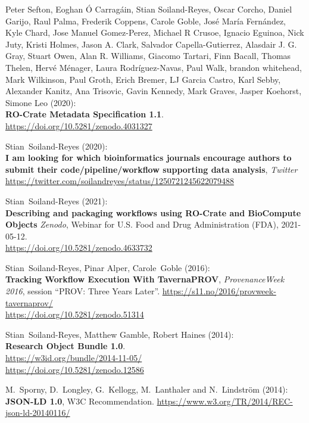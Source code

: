 \begin{thebibliography}{9}
Peter Sefton, Eoghan Ó Carragáin, Stian Soiland-Reyes, Oscar
Corcho, Daniel Garijo, Raul Palma, Frederik Coppens, Carole Goble, José
María Fernández, Kyle Chard, Jose Manuel Gomez-Perez, Michael R Crusoe,
Ignacio Eguinoa, Nick Juty, Kristi Holmes, Jason A. Clark, Salvador
Capella-Gutierrez, Alasdair J. G. Gray, Stuart Owen, Alan R. Williams,
Giacomo Tartari, Finn Bacall, Thomas Thelen, Hervé Ménager, Laura
Rodríguez-Navas, Paul Walk, brandon whitehead, Mark Wilkinson, Paul
Groth, Erich Bremer, LJ Garcia Castro, Karl Sebby, Alexander Kanitz, Ana
Trisovic, Gavin Kennedy, Mark Graves, Jasper Koehorst, Simone Leo
(2020):\\
\textbf{RO-Crate Metadata Specification 1.1}.\\
\url{https://doi.org/10.5281/zenodo.4031327}

Stian~Soiland-Reyes (2020):\\
\textbf{I am looking for which bioinformatics journals encourage authors
to submit their code/pipeline/workflow supporting data analysis},
\emph{Twitter}
\url{https://twitter.com/soilandreyes/status/1250721245622079488}

Stian~Soiland-Reyes (2021):\\
\textbf{Describing and packaging workflows using RO-Crate and BioCompute
Objects} \emph{Zenodo}, Webinar for U.S. Food and Drug Administration
(FDA), 2021-05-12.\\
\url{https://doi.org/10.5281/zenodo.4633732}

Stian~Soiland-Reyes, Pinar Alper, Carole~Goble (2016):\\
\textbf{Tracking Workflow Execution With TavernaPROV},
\emph{ProvenanceWeek 2016}, session ``PROV: Three Years Later''.
\url{https://s11.no/2016/provweek-tavernaprov/}\\
\url{https://doi.org/10.5281/zenodo.51314}

Stian~Soiland-Reyes, Matthew Gamble, Robert Haines (2014):\\
\textbf{Research Object Bundle 1.0}.\\
\url{https://w3id.org/bundle/2014-11-05/}\\
\url{https://doi.org/10.5281/zenodo.12586}

M.~Sporny, D.~Longley, G.~Kellogg, M.~Lanthaler and
N.~Lindström (2014):\\
\textbf{JSON-LD 1.0}, W3C Recommendation.
\url{https://www.w3.org/TR/2014/REC-json-ld-20140116/}


\end{thebibliography}
